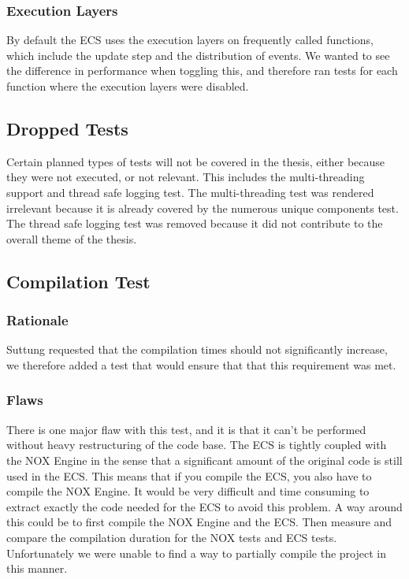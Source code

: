 \subsubsection{Execution Layers}
By default the ECS uses the execution layers on frequently called functions,
which include the update step and the distribution of events.
We wanted to see the difference in performance when toggling this,
and therefore ran tests for each function where the execution layers were disabled.

\subsection{Dropped Tests}
Certain planned types of tests will not be covered in the thesis, either because they were not executed, or not relevant.
This includes the multi-threading support and thread safe logging test.
The multi-threading test was rendered irrelevant because it is already covered by the numerous unique components test.
The thread safe logging test was removed because it did not contribute to the overall theme of the thesis.

\subsection{Compilation Test}
\subsubsection{Rationale}
Suttung requested that the compilation times should not significantly increase,
we therefore added a test that would ensure that that this requirement was met.

\subsubsection{Flaws}
There is one major flaw with this test, and it is that it can't be performed without heavy restructuring of the code base.
The ECS is tightly coupled with the NOX Engine in the sense that a significant amount of the original code is still used in the ECS.
This means that if you compile the ECS, you also have to compile the NOX Engine.
It would be very difficult and time consuming to extract exactly the code needed for the ECS to avoid this problem.
A way around this could be to first compile the NOX Engine and the ECS.
Then measure and compare the compilation duration for the NOX tests and ECS tests.
Unfortunately we were unable to find a way to partially compile the project in this manner.

